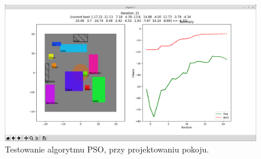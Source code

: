 \begin{figure}[H]
	\centering
	\includegraphics[width=0.7\linewidth]{imgs/program_room}
	\caption{Testowanie algorytmu PSO, przy projektowaniu pokoju.}
	\label{fig:program_room}
\end{figure}


